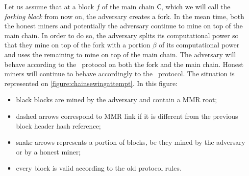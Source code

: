       Let us assume that at a block \(f\) of the main chain \(\mathsf{C}\), which we will call the \textit{forking block} from now on, the adversary creates a fork. In the mean time, both the honest miners and potentially the adversary continue to mine on top of the main chain. In order to do so, the adversary splits its computational power so that they mine on top of the fork with a portion \(\beta\) of its computational power and uses the remaining to mine on top of the main chain. The adversary will behave according to the \FC\ protocol on both the fork and the main chain. Honest miners will continue to behave accordingly to the \FC\ protocol. The situation is represented on \autoref{figure:chainsewingattempt}. In this figure:
      
      \begin{itemize}
        \item black blocks are mined by the adversary and contain a MMR root;
        \item dashed arrows correspond to MMR link if it is different from the previous block header hash reference;
        \item snake arrows represents a portion of blocks, be they mined by the adversary or by a honest miner;
        \item every block is valid according to the old protocol rules.
      \end{itemize}
    

